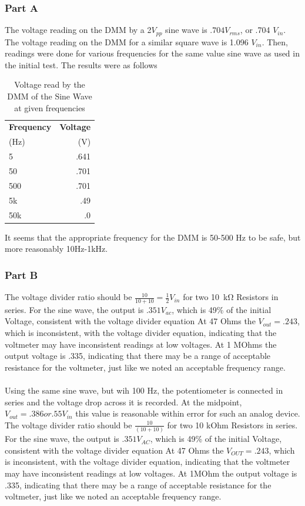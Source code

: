 \documentclass[10pt]{article}
\begin{document}
\subsubsection{Part A}

	 The voltage reading on the DMM by a 2$V_{pp}$ sine wave is $.704 V_{rms}$, or .704 $V_{in}$. The voltage reading on the DMM for a similar square wave is 1.096 $V_{in}$. Then, readings were done for various frequencies for the same value sine wave as used in the initial test. The results were as follows
	\begin{table}[H]
		\begin{center}
			\caption{Voltage read by the DMM of the Sine Wave at given frequencies}
			\label{tab: 31A}
			\begin{tabular}{l|r}
				\textbf{Frequency} & \textbf{Voltage}\\
				(Hz) & (V)\\
				\hline
				5 & .641\\
				50 & .701\\
				500 & .701\\
				5k & .49\\
				50k & .0\\
			\end{tabular}
		\end{center}
	\end{table}
	It seems that the appropriate frequency for the DMM is 50-500 Hz to be safe, but more reasonably 10Hz-1kHz.
\subsubsection{Part B}
	 The voltage divider ratio should be $\frac{10}{10+10} = \frac{1}{2} V_{in}$  for two \SI{10}{\kilo\ohm} Resistors in series. For the sine wave, the output is $.351 V_{ac}$, which is 49\% of the initial Voltage, consistent with the voltage divider equation 
	 At 47 Ohms the $V_{out} = .243$, which is inconsistent, with the voltage divider equation, indicating that the voltmeter may have inconsistent readings at low voltages. 
	 At 1 MOhms the output voltage is .335, indicating that there may be a range of acceptable resistance for the voltmeter, just like we noted an acceptable frequency range. \\\\
	Using the same sine wave, but wih 100 Hz, the potentiometer is connected in series and the voltage drop across it is recorded. At the midpoint, $V_{out} = .386 or .55 V_{in}$ this value is reasonable within error for such an analog device. 
	 The voltage divider ratio should be $\frac{10}{(10+10)}$  for two 10 kOhm Resistors in series. For the sine wave, the output is $.351 V_{AC}$, which is 49\% of the initial Voltage, consistent with the voltage divider equation 
	 At 47 Ohms the $V_{OUT} = .243$, which is inconsistent, with the voltage divider equation, indicating that the voltmeter may have inconsistent readings at low voltages. 
	 At 1MOhm the output voltage is .335, indicating that there may be a range of acceptable resistance for the voltmeter, just like we noted an acceptable frequency range.
\end{document}
